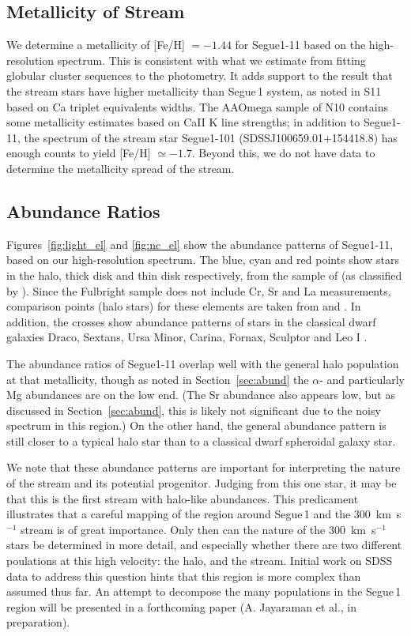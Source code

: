 \documentclass[manuscript]{aastex}
\begin{document}
\subsection{Metallicity of Stream}
We determine a metallicity of [Fe/H] $= -1.44 $ for Segue1-11 based on the high-resolution spectrum. This is consistent with what we estimate from fitting globular cluster sequences to the photometry. It adds support to the result that the stream stars have higher metallicity than Segue\,1 system, as noted in S11 based on Ca triplet equivalents widths. The AAOmega sample of N10 contains some metallicity estimates based on CaII K line strengths; in addition to Segue1-11, the spectrum of the stream star Segue1-101 (SDSSJ100659.01+154418.8) has enough counts to yield [Fe/H] $\simeq -1.7$. Beyond this, we do not have data to determine the metallicity spread of the stream. 


\subsection{Abundance Ratios}
\label{sec:ab_rat}
Figures~\ref{fig:light_el} and \ref{fig:nc_el} show the abundance patterns of Segue1-11, based on our high-resolution spectrum. The blue, cyan and red points show stars in the halo, thick disk and thin disk respectively, from the sample of \citet{Fulbright2000, Fulbright2002} (as classified by \citealt{Venn2004}). Since the Fulbright sample does not include Cr, Sr and La measurements, comparison points  (halo stars) for these elements are taken from \citet{Lai2007} and \citet{Barklem2005}. In addition, the crosses show abundance patterns of stars in the classical dwarf galaxies Draco, Sextans, Ursa Minor, Carina, Fornax, Sculptor and Leo I \citep{Shetrone2001, Shetrone2003, Geisler2005, Aoki2009, Cohen2009}.

The abundance ratios of Segue1-11 overlap well with the general halo population at that metallicity, though as noted in Section~\ref{sec:abund} the $\alpha$- and particularly Mg abundances are on the low end. (The Sr abundance also appears low, but as discussed in Section~\ref{sec:abund}, this is likely not significant due to the noisy spectrum in this region.) On the other hand, the general abundance pattern is still closer to a typical halo star than to a classical dwarf spheroidal galaxy star. 


We note that these abundance patterns are important for interpreting the nature of the stream and its potential progenitor. Judging from this one star, it may be that this is the first stream with halo-like abundances. This predicament illustrates that a careful mapping of the region around Segue\,1 and the 300~km~s$^{-1}$ stream is of great importance. Only then can the nature of the 300~km~s$^{-1}$ stars be determined in more detail, and especially whether there are two different poulations at this high velocity: the halo, and the stream. Initial work on SDSS data to address this question hints that this region is more complex than assumed thus far. An attempt to decompose the many populations in the Segue\,1 region will be presented in a forthcoming paper (A. Jayaraman et al., in preparation).
\end{document}

